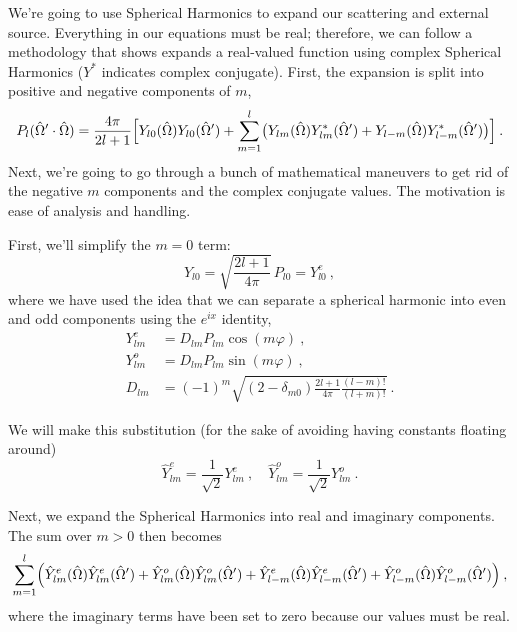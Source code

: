 \documentclass[12pt]{article}
\newcommand{\vOmega}{\ensuremath{\hat{\Omega}}}
\begin{document}
We're going to use Spherical Harmonics to expand our scattering and external source. Everything in our equations must be real; therefore, we can follow a methodology that shows expands a real-valued function using complex Spherical Harmonics ($Y^*$ indicates complex conjugate).  First,
the expansion is split into positive and negative components of $m$,
\begin{equation}
  P_l(\vOmega'\cdot\vOmega) = \frac{4\pi}{2l+1}
  \Bigl[
  Y_{l0}(\vOmega)Y_{l0}(\vOmega') +
  \sum_{m=1}^l
  \bigl(Y_{lm}(\vOmega)Y^{\ast}_{lm}(\vOmega') +
  Y_{l-m}(\vOmega)Y^{\ast}_{l-m}(\vOmega')\bigr)\Bigr]\:.
\end{equation}
Next, we're going to go through a bunch of mathematical maneuvers to get rid of the negative $m$ components and the complex conjugate values. The motivation is ease of analysis and handling. 

First, we'll simplify the $m=0$ term:
\begin{equation}
  Y_{l0} = \sqrt{\frac{2l+1}{4\pi}}\,P_{l0} = Y^e_{l0}\:,
\end{equation}
where we have used the idea that we can separate a spherical harmonic into even and odd components using the $e^{ix}$ identity,
\begin{align}
  Y^e_{lm} &= D_{lm}P_{lm}\cos (m\varphi)\:,\label{eq:Ye}\\
  Y^o_{lm} &= D_{lm}P_{lm}\sin (m\varphi)\:,\label{eq:Yo}\\
  D_{lm} &= (-1)^m\sqrt{(2-\delta_{m0})\frac{2l+1}{4\pi}
    \frac{(l-m)!}{(l+m)!}}\:.
\end{align}

We will make this substitution (for the sake of avoiding having constants floating around)
\begin{equation}
  \hat{Y}^e_{lm} = \frac{1}{\sqrt{2}}Y^e_{lm}\:,\quad
  \hat{Y}^o_{lm} = \frac{1}{\sqrt{2}}Y^o_{lm}\:.
\end{equation}

Next, we expand the Spherical Harmonics into real and imaginary components. The sum over $m>0$ then becomes 
\begin{equation}
  \sum_{m=1}^l\Bigl(
  \hat{Y}^e_{lm}(\vOmega)\hat{Y}^e_{lm}(\vOmega') +
  \hat{Y}^o_{lm}(\vOmega)\hat{Y}^o_{lm}(\vOmega') +
  \hat{Y}^e_{l-m}(\vOmega)\hat{Y}^e_{l-m}(\vOmega') +
  \hat{Y}^o_{l-m}(\vOmega)\hat{Y}^o_{l-m}(\vOmega')\Bigr)\:,
\end{equation}
where the imaginary terms have been set to zero because our values must be
real. 
\end{document}
